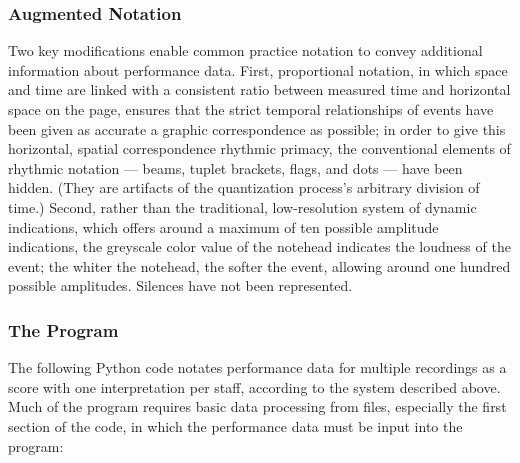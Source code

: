 \subsubsection{Augmented Notation}

Two key modifications enable common practice notation to convey additional information about performance data. First, proportional notation, in which space and time are linked with a consistent ratio between measured time and horizontal space on the page, ensures that the strict temporal relationships of events have been given as accurate a graphic correspondence as possible; in order to give this horizontal, spatial correspondence rhythmic primacy, the conventional elements of rhythmic notation --- beams, tuplet brackets, flags, and dots --- have been hidden. (They are artifacts of the quantization process's arbitrary division of time.) Second, rather than the traditional, low-resolution system of dynamic indications, which offers around a maximum of ten possible amplitude indications, the greyscale color value of the notehead indicates the loudness of the event; the whiter the notehead, the softer the event, allowing around one hundred possible amplitudes. Silences have not been represented. 

\subsubsection{The Program}

The following Python code notates performance data for multiple recordings as a score with one interpretation per staff, according to the system described above. Much of the program requires basic data processing from files, especially the first section of the code, in which the performance data must be input into the program: 


